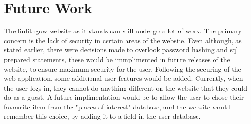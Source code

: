 \documentclass[12pt,a4paper]{article}
\begin{document}
	\section{Future Work}
	The linlithgow website as it stands can still undergo a lot of work. The primary concern is the lack of security in certain areas of the website. Even although, as stated earlier, there were decisions made to overlook password hashing and sql prepared statements, these would be immplimented in future releases of the website, to ensure maximum security for the user. Following the securing of the web application, some additional user features would be added. Currently, when the user logs in, they cannot do anything different on the website that they could do as a guest. A future implimentation would be to allow the user to chose their favourite item from the "places of interest" database, and the website would remember this choice, by adding it to a field in the user database. 

	\clearpage






\end{document}

